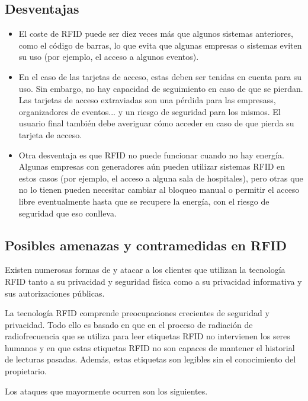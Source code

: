 \documentclass[12pt,a4paper,onecolumn,oneside]{report}
\begin{document}
\subsection{Desventajas}
\begin{itemize}
\item El coste de RFID puede ser diez veces más que algunos sistemas anteriores, como el código de barras, lo que evita que algunas empresas o sistemas eviten su uso (por ejemplo, el acceso a algunos eventos). 
\item En el caso de las tarjetas de acceso, estas deben ser tenidas en cuenta para su uso. Sin embargo, no hay capacidad de seguimiento en caso de que se pierdan. Las tarjetas de acceso extraviadas son una pérdida para las empresass, organizadores de eventos... y un riesgo de seguridad para los mismos. El usuario final también debe averiguar cómo acceder en caso de que pierda su tarjeta de acceso.
\item Otra desventaja es que RFID no puede funcionar cuando no hay energía. Algunas empresas con generadores aún pueden utilizar sistemas RFID en estos casos (por ejemplo, el acceso a alguna sala de hospitales), pero otras que no lo tienen pueden necesitar cambiar al bloqueo manual o permitir el acceso libre eventualmente hasta que se recupere la energía, con el riesgo de seguridad que eso conlleva.
\end{itemize}


\subsection{Posibles amenazas y contramedidas en RFID}
\label{Posibles amenazas y contramedidas en RFID}

Existen numerosas formas de y atacar a los clientes que utilizan la tecnología RFID tanto a su privacidad y seguridad física como a su privacidad informativa y sus autorizaciones públicas.

La tecnología RFID comprende preocupaciones crecientes de seguridad y privacidad. Todo ello es basado en que en el proceso de radiación de radiofrecuencia que se utiliza para leer etiquetas RFID no intervienen los seres humanos y en que estas etiquetas RFID no son capaces de mantener el historial de lecturas pasadas. Además, estas etiquetas son legibles sin el conocimiento del propietario.

Los ataques que mayormente ocurren son los siguientes.
\end{document}
